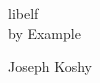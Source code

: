 \pagestyle{empty}
\raggedleft

\sffamily
{}

\vspace*{\baselineskip}

\fontsize{60}{64}\selectfont

libelf \\[0.25\baselineskip]
by Example

\textheight

\fontsize{32}{36}\selectfont

Joseph Koshy
